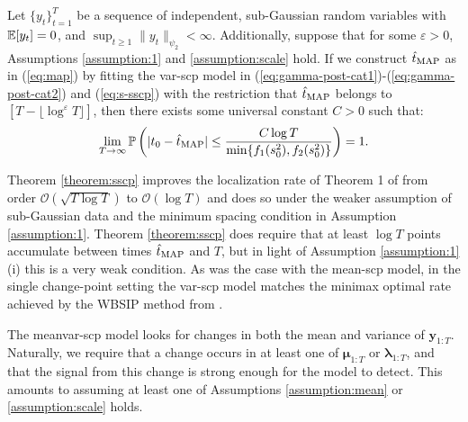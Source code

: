 \begin{theorem}\label{theorem:sscp}
    Let $\{y_t\}_{t=1}^T$ be a sequence of independent, sub-Gaussian random variables with $\E[y_t]=0$, and $\sup_{t \geq 1} \lVert y_t\rVert_{\psi_2} < \infty$. Additionally, suppose that for some $\varepsilon >0$, Assumptions \ref{assumption:1} and \ref{assumption:scale} hold. If we construct $\hat{t}_{\normalfont \text{MAP}}$ as in (\ref{eq:map}) by fitting the var-scp model in (\ref{eq:gamma-post-cat1})-(\ref{eq:gamma-post-cat2}) and (\ref{eq:s-sscp}) with the restriction that $\hat{t}_{\normalfont \text{MAP}}$ belongs to $[T - \lfloor \log^\varepsilon T\rfloor]$, then there exists some universal constant $C > 0$ such that:
    \vspace{-2.5pt}
    \begin{align}
        \lim_{T\to\infty}\Pr\left(|t_0 - \hat{t}_{\normalfont \text{MAP}}| \leq \frac{C \log T}{\min\{f_1(s_0^2),f_2(s_0^2)\}} \right) = 1. \label{eq:thm-2}
    \end{align}
\end{theorem}
\vspace{-5pt}

Theorem \ref{theorem:sscp} improves the localization rate of Theorem 1 of \cite{Cappello22} from order $\mathcal{O}(\sqrt{T\log T})$ to $\mathcal{O}(\log T)$ and does so under the weaker assumption of sub-Gaussian data and the minimum spacing condition in Assumption \ref{assumption:1}. Theorem \ref{theorem:sscp} does require that at least $\log T$ points accumulate between times $\hat{t}_{\normalfont \text{MAP}}$ and $T$, but in light of Assumption \ref{assumption:1} (i) this is a very weak condition. As was the case with the mean-scp model, in the single change-point setting the var-scp model matches the minimax optimal rate achieved by the WBSIP method from \cite{Wang21}. 

The meanvar-scp model looks for changes in both the mean and variance of $\mathbf{y}_{1:T}$. Naturally, we require that a change occurs in at least one of $\boldsymbol{\mu}_{1:T}$ or $\boldsymbol{\lambda}_{1:T}$, and that the signal from this change is strong enough for the model to detect. This amounts to assuming at least one of Assumptions \ref{assumption:mean} or \ref{assumption:scale} holds.

